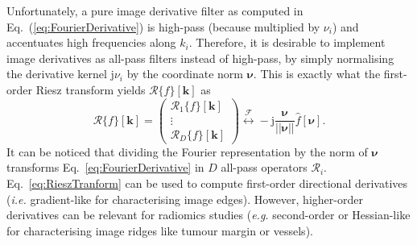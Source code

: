 \documentclass[fleqn,a4paper,oneside,openany]{book}
\begin{document}
Unfortunately, a pure image derivative filter as computed in Eq.~(\ref{eq:FourierDerivative}) is high-pass (because multiplied by $\nu_i$) and accentuates high frequencies along $k_i$.
Therefore, it is desirable to implement image derivatives as all-pass filters instead of high-pass, by simply normalising the derivative kernel $\mathrm{j}\nu_i$ by the coordinate norm $\boldsymbol{\nu}$.
This is exactly what the first-order Riesz transform yields $\boldsymbol{\mathcal{R}}\{f\}[\boldsymbol{k}]$ as~\cite{UnV2010}
%
\begin{equation}\label{eq:RieszTranform}
\boldsymbol{\mathcal{R}}\{f\}[\boldsymbol{k}]=
\left(
\begin{array}{c}
{\mathcal R}_1 \{f\}[\boldsymbol{k}]   \\
\vdots \\
{\mathcal R}_D \{f\}[\boldsymbol{k}] 
\end{array}
\right)
\overset{\mathcal{F}}{\longleftrightarrow} -\mathrm{j}\frac{\boldsymbol{\nu}}{||\boldsymbol{\nu}||}\hat{f}[\boldsymbol{\nu}].
\end{equation}
%
It can be noticed that dividing the Fourier representation by the norm of $\boldsymbol{\nu}$ transforms Eq.~\eqref{eq:FourierDerivative} in $D$ all-pass operators $\mathcal{R}_i$.
Eq.~\eqref{eq:RieszTranform} can be used to compute first-order directional derivatives (\textit{i.e.} gradient-like for characterising image edges).
However, higher-order derivatives can be relevant for radiomics studies (\textit{e.g.} second-order or Hessian-like for characterising image ridges like tumour margin or vessels).
\end{document}
